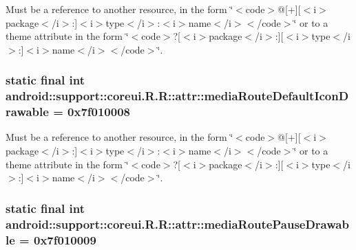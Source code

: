 Must be a reference to another resource, in the form \char`\"{}$<$code$>$@\mbox{[}+\mbox{]}\mbox{[}$<$i$>$package$<$/i$>$:\mbox{]}$<$i$>$type$<$/i$>$:$<$i$>$name$<$/i$>$$<$/code$>$\char`\"{} or to a theme attribute in the form \char`\"{}$<$code$>$?\mbox{[}$<$i$>$package$<$/i$>$:\mbox{]}\mbox{[}$<$i$>$type$<$/i$>$:\mbox{]}$<$i$>$name$<$/i$>$$<$/code$>$\char`\"{}. \hypertarget{classandroid_1_1support_1_1coreui_1_1_r_1_1attr_4c699393cb9898ab4171b330f61da147}{
\subsubsection[{mediaRouteDefaultIconDrawable}]{\setlength{\rightskip}{0pt plus 5cm}static final int android::support::coreui.R.R::attr::mediaRouteDefaultIconDrawable = 0x7f010008}}
\label{classandroid_1_1support_1_1coreui_1_1_r_1_1attr_4c699393cb9898ab4171b330f61da147}


Must be a reference to another resource, in the form \char`\"{}$<$code$>$@\mbox{[}+\mbox{]}\mbox{[}$<$i$>$package$<$/i$>$:\mbox{]}$<$i$>$type$<$/i$>$:$<$i$>$name$<$/i$>$$<$/code$>$\char`\"{} or to a theme attribute in the form \char`\"{}$<$code$>$?\mbox{[}$<$i$>$package$<$/i$>$:\mbox{]}\mbox{[}$<$i$>$type$<$/i$>$:\mbox{]}$<$i$>$name$<$/i$>$$<$/code$>$\char`\"{}. \hypertarget{classandroid_1_1support_1_1coreui_1_1_r_1_1attr_b300d6e4169f8c7b92f82fce2874a88c}{
\subsubsection[{mediaRoutePauseDrawable}]{\setlength{\rightskip}{0pt plus 5cm}static final int android::support::coreui.R.R::attr::mediaRoutePauseDrawable = 0x7f010009}}
\label{classandroid_1_1support_1_1coreui_1_1_r_1_1attr_b300d6e4169f8c7b92f82fce2874a88c}


